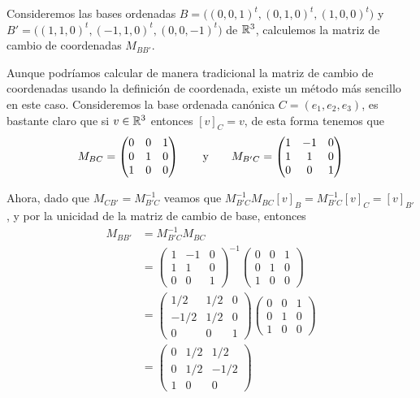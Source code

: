 \begin{example}
  Consideremos las bases ordenadas $B = \bigl( (0,0,1)^t, (0,1,0)^t, (1,0,0)^t \bigr)$ y $B' = \bigl( (1,1,0)^t, (-1, 1, 0)^t, (0,0,-1)^t \bigr)$ de $\mathbb{R}^3$, calculemos la matriz de cambio de coordenadas $M_{BB'}$.

  \examplesolution
  Aunque podríamos calcular de manera tradicional la matriz de cambio de coordenadas usando la definición de coordenada, existe un método más sencillo en este caso. Consideremos la base ordenada canónica $C = (e_1, e_2, e_3)$, es bastante claro que si $v \in \mathbb{R}^3$ entonces $[v]_C = v$, de esta forma tenemos que
  \[
    M_{BC} = \begin{pmatrix}
      0 & 0 & 1 \\
      0 & 1 & 0 \\
      1 & 0 & 0
    \end{pmatrix} \qquad\text{y}\qquad
    M_{B'C} = \begin{pmatrix}
      1 & -1 & 0 \\
      1 & 1  & 0 \\
      0 & 0  & 1
    \end{pmatrix}
  \]

  Ahora, dado que $M_{CB'} = M_{B'C}^{-1}$ veamos que $M_{B'C}^{-1} M_{BC}[v]_B = M_{B'C}^{-1}[v]_C = [v]_{B'}$, y por la unicidad de la matriz de cambio de base, entonces
  \begin{align*}
    M_{BB'} &= M_{B'C}^{-1} M_{BC} \\
      &= \begin{pmatrix}
        1 & -1 & 0 \\
        1 & 1  & 0 \\
        0 & 0  & 1
        \end{pmatrix}^{-1}
        \begin{pmatrix}
        0 & 0 & 1 \\
        0 & 1 & 0 \\
        1 & 0 & 0
        \end{pmatrix}  \\
      &= \begin{pmatrix}
        1/2  & 1/2 & 0 \\
        -1/2 & 1/2 & 0 \\
        0    & 0   & 1
        \end{pmatrix}
        \begin{pmatrix}
        0 & 0 & 1 \\
        0 & 1 & 0 \\
        1 & 0 & 0
        \end{pmatrix} \\
      &= \begin{pmatrix}
        0 & 1/2  & 1/2  \\
        0 & 1/2  & -1/2 \\
        1 & 0    & 0
        \end{pmatrix}
  \end{align*}
\end{example}

